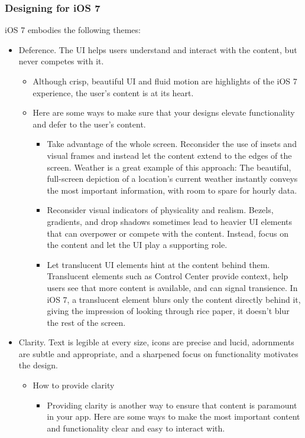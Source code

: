 \subsubsection*{Designing for iOS 7}
iOS 7 embodies the following themes:
\begin{itemize}
\item Deference. The UI helps users understand and interact with the content, but never competes with it.
	\begin{itemize}
    \item Although crisp, beautiful UI and fluid motion are highlights of the iOS 7 experience, the user's content is at its heart.
	\item Here are some ways to make sure that your designs elevate functionality and defer to the user's content.
		\begin{itemize}
		\item Take advantage of the whole screen. Reconsider the use of insets and visual frames and instead let the content extend to the edges of the screen. Weather is a great example of this approach: The beautiful, full-screen depiction of a location's current weather instantly conveys the most important information, with room to spare for hourly data.
		\item Reconsider visual indicators of physicality and realism. Bezels, gradients, and drop shadows sometimes lead to heavier UI elements that can overpower or compete with the content. Instead, focus on the content and let the UI play a supporting role.
		\item Let translucent UI elements hint at the content behind them. Translucent elements such as Control Center provide context, help users see that more content is available, and can signal transience. In iOS 7, a translucent element blurs only the content directly behind it, giving the impression of looking through rice paper, it doesn’t blur the rest of the screen.
		\end{itemize}
	\end{itemize}
\newpage
\item Clarity. Text is legible at every size, icons are precise and lucid, adornments are subtle and appropriate, and a sharpened focus on functionality motivates the design.
	\begin{itemize}
	\item How to provide clarity
		\begin{itemize}
		\item Providing clarity is another way to ensure that content is paramount in your app. Here are some ways to make the most important content and functionality clear and easy to interact with.

\end{itemize}
\end{itemize}
\end{itemize}
